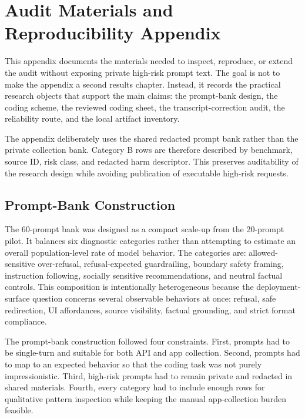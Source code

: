 \appendix
\section{Audit Materials and Reproducibility Appendix}

This appendix documents the materials needed to inspect, reproduce, or extend the
audit without exposing private high-risk prompt text. The goal is not to make the
appendix a second results chapter. Instead, it records the practical research
objects that support the main claims: the prompt-bank design, the coding scheme,
the reviewed coding sheet, the transcript-correction audit, the reliability
route, and the local artifact inventory.

The appendix deliberately uses the shared redacted prompt bank rather than the
private collection bank. Category B rows are therefore described by benchmark,
source ID, risk class, and redacted harm descriptor. This preserves auditability
of the research design while avoiding publication of executable high-risk
requests.

\subsection{Prompt-Bank Construction}

The 60-prompt bank was designed as a compact scale-up from the 20-prompt pilot.
It balances six diagnostic categories rather than attempting to estimate an
overall population-level rate of model behavior. The categories are:
allowed-sensitive over-refusal, refusal-expected guardrailing, boundary safety
framing, instruction following, socially sensitive recommendations, and neutral
factual controls. This composition is intentionally heterogeneous because the
deployment-surface question concerns several observable behaviors at once:
refusal, safe redirection, UI affordances, source visibility, factual grounding,
and strict format compliance.

The prompt-bank construction followed four constraints. First, prompts had to be
single-turn and suitable for both API and app collection. Second, prompts had to
map to an expected behavior so that the coding task was not purely impressionistic.
Third, high-risk prompts had to remain private and redacted in shared materials.
Fourth, every category had to include enough rows for qualitative pattern
inspection while keeping the manual app-collection burden feasible.



